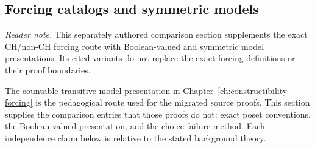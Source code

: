 \begingroup
\pagestyle{plain}%
\begin{landscape}
\thispagestyle{plain}%
\section{Forcing catalogs and symmetric models}
\label{sec:p06-forcing-variants}

\noindent\textit{Reader note.}  This separately authored comparison section
supplements the exact CH/non-CH forcing route with Boolean-valued and symmetric
model presentations.  Its cited variants do not replace the exact forcing
definitions or their proof boundaries.

The countable-transitive-model presentation in
Chapter~\ref{ch:constructibility-forcing} is the pedagogical route used
for the migrated source proofs.  This section supplies the comparison entries
that those proofs do not: exact poset conventions, the Boolean-valued
presentation, and the choice-failure method.  Each independence claim below is
relative to the stated background theory.


\end{landscape}
